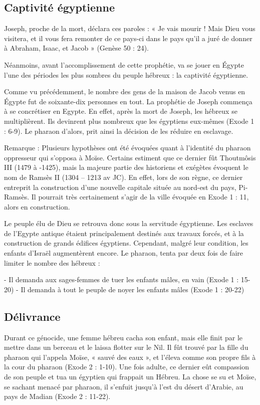 \subsection*{Captivité égyptienne}

Joseph, proche de la mort, déclara ces paroles :
« Je vais mourir ! Mais Dieu vous visitera, et il vous fera remonter de ce pays-ci dans le pays qu'il a juré de donner à Abraham, Isaac, et Jacob » (Genèse 50 : 24).

Néanmoins, avant l'accomplissement de cette prophétie, va se jouer en Égypte l'une des périodes les plus sombres du peuple hébreux : la captivité égyptienne.

Comme vu précédemment, le nombre des gens de la maison de Jacob venus en Égypte fut de soixante-dix personnes en tout. La prophétie de Joseph commença à se concrétiser en Egypte. En effet, après la mort de Joseph, les hébreux se multiplièrent. Ils devinrent plus nombreux que les égyptiens eux-mêmes (Exode 1 : 6-9). Le pharaon d'alors, prit ainsi la décision de les réduire en esclavage.

Remarque : Plusieurs hypothèses ont été évoquées quant à l'identité du pharaon oppresseur qui s'opposa à Moïse. Certains estiment que ce dernier fût Thoutmôsis III (1479 à -1425), mais la majeure partie des historiens et exégètes évoquent le nom de Ramsès II (1304 – 1213 av JC). En effet, lors de son règne, ce dernier entreprit la construction d'une nouvelle capitale située au nord-est du pays, Pi-Ramsès. Il pourrait très certainement s'agir de la ville évoquée en Exode 1 : 11, alors en construction.

Le peuple élu de Dieu se retrouva donc sous la servitude égyptienne. Les esclaves de l'Egypte antique étaient principalement destinés aux travaux forcés, et à la construction de grands édifices égyptiens. Cependant, malgré leur condition, les enfants d'Israël augmentèrent encore. Le pharaon, tenta par deux fois de faire limiter le nombre des hébreux :

- Il demanda aux sages-femmes de tuer les enfants mâles, en vain (Exode 1 : 15-20)
- Il demanda à tout le peuple de noyer les enfants mâles (Exode 1 : 20-22)

\subsection*{Délivrance}

Durant ce génocide, une femme hébreu cacha son enfant, mais elle finit par le mettre dans un berceau et le laissa flotter sur le Nil. Il fût trouvé par la fille du pharaon qui l'appela Moïse, « sauvé des eaux », et l'éleva comme son propre fils à la cour du pharaon (Exode 2 : 1-10). Une fois adulte, ce dernier eût compassion de son peuple et tua un égyptien qui frappait un Hébreu. La chose se su et Moïse, se sachant menacé par pharaon, il s'enfuit jusqu'à l'est du désert d'Arabie, au pays de Madian (Exode 2 : 11-22).

